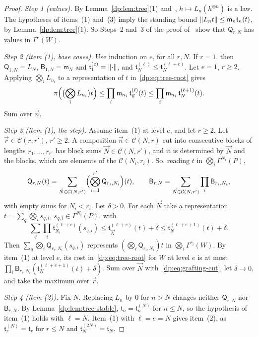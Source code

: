 \begin{proof}
\emph{Step 1 (values).} By Lemma~\ref{dp:lem:tree}(1) and~\cite[Lemma~Q.1(2)]{I}, $h\mapsto L_n(h^{\otimes n})$ is a law. The hypotheses of items~(1) and~(3) imply the standing bound $\lVert L_nt\rVert\le\mathsf m_n\mathfrak t_n(t)$, by Lemma~\ref{dp:lem:tree}(1). So Steps~2 and~3 of the proof of~\cite[Lemma~Q.4]{I} show that $\mathsf Q_{r,N}$ has values in $\Gamma^r(W)$.

\emph{Step 2 (item (1), base cases).} Use induction on $e$, for all $r,N$. If $r=1$, then $\mathsf Q_{1,N}=L_N$, $\mathsf B_{1,N}=\mathsf m_N$ and $\mathfrak t^{(e)}_1=\lVert \cdot\rVert$, and $\mathfrak t^{(\ell)}_N\le\mathfrak t^{(\ell+e)}_N$. Let $e=1$, $r\ge2$. Applying $\bigotimes_iL_{n_i}$ to a representation of $t$ in~\eqref{dp:eq:tree-root} gives
\[
 \pi\Bigl(\bigl(\bigotimes_iL_{n_i}\bigr)t\Bigr)\le\prod_i\mathsf m_{n_i}\,\mathfrak t^{(\ell)}_{\vec n}(t)\le\prod_i\mathsf m_{n_i}\,\mathfrak t^{(\ell+1)}_N(t).
\]
Sum over $\vec n$.

\emph{Step 3 (item (1), the step).} Assume item~(1) at level $e$, and let $r\ge2$. Let $\vec r\in\mathcal C(r,r')$, $r'\ge2$. A composition $\vec n\in\mathcal C(N,r)$ cut into consecutive blocks of lengths $r_1,\dots,r_{r'}$ has block sums $\vec N\in\mathcal C(N,r')$, and it is determined by $\vec N$ and the blocks, which are elements of the $\mathcal C(N_i,r_i)$. So, reading $t$ in $\bigotimes_i\Gamma^{N_i}(P)$,
\begin{equation}\label{dp:eq:grafting-cut}
 \mathsf Q_{r,N}(t)=\sum_{\vec N\in\mathcal C(N,r')}\Bigl(\bigotimes_{i=1}^{r'}\mathsf Q_{r_i,N_i}\Bigr)(t),\qquad
 \mathsf B_{r,N}=\sum_{\vec N\in\mathcal C(N,r')}\prod_i\mathsf B_{r_i,N_i},
\end{equation}
with empty sums for $N_i<r_i$. Let $\delta>0$. For each $\vec N$ take a representation $t=\sum_q\bigotimes_is_{q,i}$, $s_{q,i}\in\Gamma^{N_i}(P)$, with
\[
 \sum_q\prod_i\mathfrak t^{(\ell+e)}_{N_i}(s_{q,i})\le\mathfrak t^{(\ell+e)}_{\vec N}(t)+\delta\le\mathfrak t^{(\ell+e+1)}_N(t)+\delta.
\]
Then $\sum_q\bigotimes_i\mathsf Q_{r_i,N_i}(s_{q,i})$ represents $(\bigotimes_i\mathsf Q_{r_i,N_i})t$ in $\bigotimes_i\Gamma^{r_i}(W)$. By item~(1) at level $e$, its cost in~\eqref{dp:eq:tree-root} for $W$ at level $e$ is at most $\prod_i\mathsf B_{r_i,N_i}(\mathfrak t^{(\ell+e+1)}_N(t)+\delta)$. Sum over $\vec N$ with~\eqref{dp:eq:grafting-cut}, let $\delta\to0$, and take the maximum over $\vec r$.

\emph{Step 4 (item (2)).} Fix $N$. Replacing $L_n$ by $0$ for $n>N$ changes neither $\mathsf Q_{r,N}$ nor $\mathsf B_{r,N}$. By Lemma~\ref{dp:lem:tree-stable}, $\mathfrak t_n=\mathfrak t^{(N)}_n$ for $n\le N$, so the hypothesis of item~(1) holds with $\ell=N$. Item~(1) with $\ell=e=N$ gives item~(2), as $\mathfrak t^{(N)}_r=\mathfrak t_r$ for $r\le N$ and $\mathfrak t^{(2N)}_N=\mathfrak t_N$.


\end{proof}
